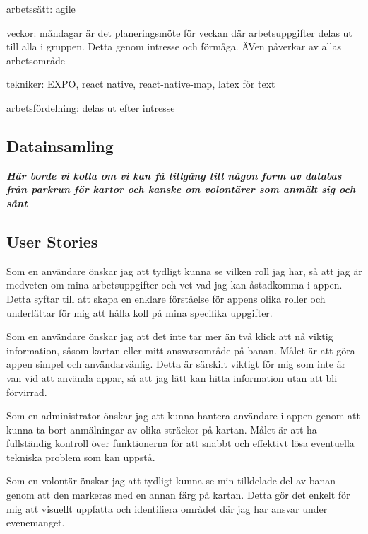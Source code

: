arbetssätt: agile

veckor: måndagar är det planeringsmöte för veckan där arbetsuppgifter delas ut till alla i gruppen. Detta genom intresse och förmåga. ÄVen påverkar av allas arbetsområde

tekniker: EXPO, react native, react-native-map, latex för text

arbetsfördelning: delas ut efter intresse


\subsection{Datainsamling}

\textbf{\textit{Här borde vi kolla om vi kan få tillgång till någon form av databas från parkrun för kartor och kanske om volontärer som anmält sig och sånt}}

\subsection{User Stories}

Som en användare önskar jag att tydligt kunna se vilken roll jag har, så att jag är medveten om mina arbetsuppgifter och vet vad jag kan åstadkomma i appen. Detta syftar till att skapa en enklare förståelse för appens olika roller och underlättar för mig att hålla koll på mina specifika uppgifter.

\vspace{1em}
Som en användare önskar jag att det inte tar mer än två klick att nå viktig information, såsom kartan eller mitt ansvarsområde på banan. Målet är att göra appen simpel och användarvänlig. Detta är särskilt viktigt för mig som inte är van vid att använda appar, så att jag lätt kan hitta information utan att bli förvirrad.

\vspace{1em}
Som en administrator önskar jag att kunna hantera användare i appen genom att kunna ta bort anmälningar av olika sträckor på kartan. Målet är att ha fullständig kontroll över funktionerna för att snabbt och effektivt lösa eventuella tekniska problem som kan uppstå.

\vspace{1em}
Som en volontär önskar jag att tydligt kunna se min tilldelade del av banan genom att den markeras med en annan färg på kartan. Detta gör det enkelt för mig att visuellt uppfatta och identifiera området där jag har ansvar under evenemanget.

